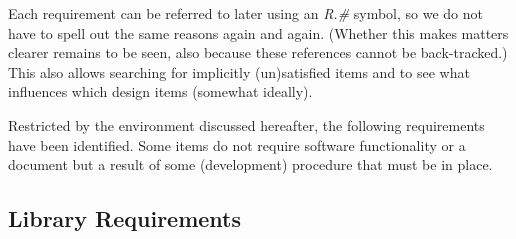 \documentclass[a4paper,11pt]{article}
\begin{document}
Each requirement can be referred to later using an \textit{R.\#} symbol, so we do not have to spell out the same reasons again and again. %
(Whether this makes matters clearer remains to be seen, also because these references cannot be back-tracked.)
This also allows searching for implicitly (un)satisfied items and to see what influences which design items (somewhat ideally).

Restricted by the environment discussed hereafter, the following requirements have been identified.
Some items do not require software functionality or a document but a result of some (development) procedure that must be in place.

\subsection{Library Requirements} \label{sec:lib_reqs}
\end{document}

